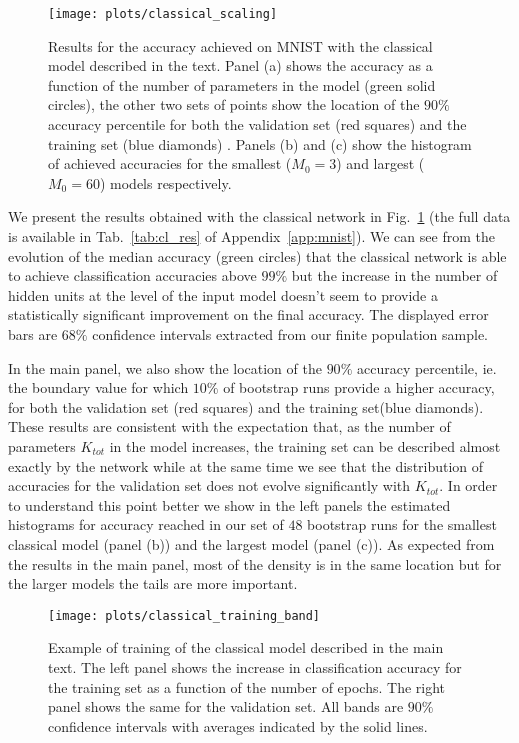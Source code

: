\begin{figure}[]
	\centering
	 \texttt{[image: plots/classical\_scaling]}
	\caption{ Results for the accuracy achieved on MNIST with the classical model described in the text. Panel (a) shows the accuracy as a function of the number of parameters in the model (green solid circles), the other two sets of points show the location of  the $90\%$ accuracy percentile for both the validation set (red squares) and the training set (blue diamonds) . Panels (b) and (c) show the histogram of achieved accuracies for the smallest ($M_0=3$) and largest ($M_0=60$) models respectively.  }
	\label{fig:cl_accuracy}
\end{figure}

We present the results obtained with the classical network in Fig.~\ref{fig:cl_accuracy} (the full data is available in Tab.~\ref{tab:cl_res} of Appendix~\ref{app:mnist}). We can see from the evolution of the median accuracy (green circles) that the classical network is able to achieve classification accuracies above $99\%$ but the increase in the number of hidden units at the level of the input model doesn't seem to provide a statistically significant improvement on the final accuracy. The displayed error bars are $68\%$ confidence intervals extracted from our finite population sample.

In the main panel, we also show the location of the $90\%$ accuracy percentile, ie. the boundary value for which $10\%$ of bootstrap runs provide a higher accuracy, for both the validation set (red squares) and the training set(blue diamonds).
These results are consistent with the expectation that, as the number of parameters $K_{tot}$  in the model increases, the training set can be described almost exactly by the network while at the same time we see that the distribution of accuracies for the  validation set does not evolve significantly with $K_{tot}$. In order to understand this point better we show in the left panels the estimated histograms for accuracy reached in our set of $48$ bootstrap runs for the smallest classical model (panel (b)) and the largest model (panel (c)). As expected from the results in the main panel, most of the density is in the same location but for the larger models the tails are more important.

\begin{figure}[]
	\centering
	 \texttt{[image: plots/classical\_training\_band]}
	\caption{ Example of training of the classical model described in the main text. The left panel shows the increase in classification accuracy for the training set as a function of the number of epochs. The right panel shows the same for the validation set.  All bands are $90\%$ confidence intervals with averages indicated by the solid lines.}
	\label{fig:cl_train}
\end{figure}

